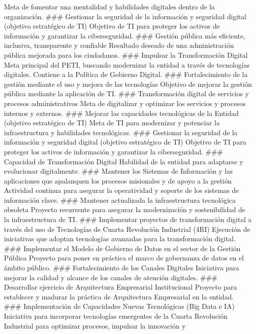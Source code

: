 \documentclass[
	a4paper, %
	12pt, %
]{include/CSSullivanBusinessReport}
\begin{document}
Meta de fomentar una mentalidad y habilidades digitales dentro de la
organización. \#\#\# Gestionar la seguridad de la información y
seguridad digital (objetivo estratégico de TI) Objetivo de TI para
proteger los activos de información y garantizar la ciberseguridad.
\#\#\# Gestión pública más eficiente, inclusiva, transparente y
confiable Resultado deseado de una administración pública mejorada para
los ciudadanos. \#\#\# Impulsar la Transformación Digital Meta principal
del PETI, buscando modernizar la entidad a través de tecnologías
digitales. Contiene a la Política de Gobierno Digital. \#\#\#
Fortalecimiento de la gestión mediante el uso y mejora de las
tecnologías Objetivo de mejorar la gestión pública mediante la
aplicación de TI. \#\#\# Transformación digital de servicios y procesos
administrativos Meta de digitalizar y optimizar los servicios y procesos
internos y externos. \#\#\# Mejorar las capacidades tecnológicas de la
Entidad (objetivo estratégico de TI) Meta de TI para modernizar y
potenciar la infraestructura y habilidades tecnológicas. \#\#\#
Gestionar la seguridad de la información y seguridad digital (objetivo
estratégico de TI) Objetivo de TI para proteger los activos de
información y garantizar la ciberseguridad. \#\#\# Capacidad de
Transformación Digital Habilidad de la entidad para adaptarse y
evolucionar digitalmente. \#\#\# Mantener los Sistemas de Información y
las aplicaciones que apalanquen los procesos misionales y de apoyo a la
gestión Actividad continua para asegurar la operatividad y soporte de
los sistemas de información clave. \#\#\# Mantener actualizada la
infraestructura tecnológica obsoleta Proyecto recurrente para asegurar
la modernización y sostenibilidad de la infraestructura de TI. \#\#\#
Implementar proyectos de transformación digital a través del uso de
Tecnologías de Cuarta Revolución Industrial (4RI) Ejecución de
iniciativas que adoptan tecnologías avanzadas para la transformación
digital. \#\#\# Implementar el Modelo de Gobierno de Datos en el sector
de la Gestión Pública Proyecto para poner en práctica el marco de
gobernanza de datos en el ámbito público. \#\#\# Fortalecimiento de los
Canales Digitales Iniciativa para mejorar la calidad y alcance de los
canales de atención digitales. \#\#\# Desarrollar ejercicio de
Arquitectura Empresarial Institucional Proyecto para establecer y
madurar la práctica de Arquitectura Empresarial en la entidad. \#\#\#
Implementación de Capacidades Nuevas Tecnológicas (Big Data e IA)
Iniciativa para incorporar tecnologías emergentes de la Cuarta
Revolución Industrial para optimizar procesos, impulsar la innovación y
\end{document}
